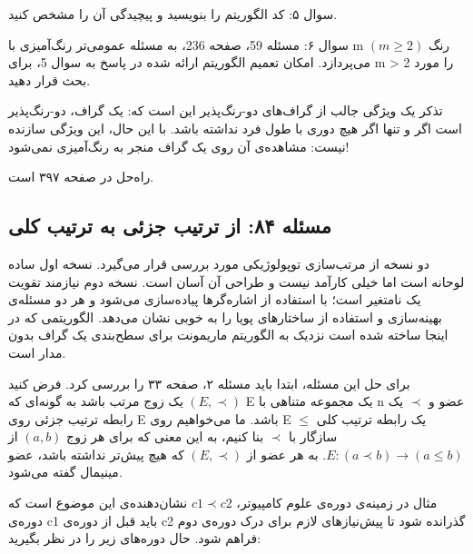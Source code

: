 \documentclass{book} %
\begin{document}
سوال ۵: کد الگوریتم را بنویسید و پیچیدگی آن را مشخص کنید.

سوال ۶: مسئله 59، صفحه 236، به مسئله عمومی‌تر رنگ‌آمیزی با m رنگ $(m \geq 2)$ می‌پردازد.
امکان تعمیم الگوریتم ارائه شده در پاسخ به سوال 5، برای m > 2 را مورد بحث قرار دهید.

تذکر
یک ویژگی جالب از گراف‌های دو-رنگ‌پذیر این است که: یک گراف، دو-رنگ‌پذیر است اگر و تنها اگر هیچ دوری با طول فرد نداشته باشد. با این حال، این ویژگی سازنده نیست: مشاهده‌ی آن روی یک گراف منجر به رنگ‌آمیزی نمی‌شود!

راه‌حل در صفحه ۳۹۷ است.

\newpage

\subsection {مسئله ۸۴: از ترتیب جزئی به ترتیب کلی}

دو نسخه از مرتب‌سازی توپولوژیکی مورد بررسی قرار می‌گیرد. نسخه اول ساده لوحانه است
اما خیلی کارآمد نیست و طراحی آن آسان است. نسخه دوم نیازمند تقویت یک نامتغیر است؛ با استفاده از اشاره‌گرها پیاده‌سازی می‌شود و هر دو مسئله‌ی بهینه‌سازی و
استفاده از ساختارهای پویا را به خوبی نشان می‌دهد. الگوریتمی که در اینجا ساخته شده است
نزدیک به الگوریتم ماریمونت برای سطح‌بندی یک گراف بدون مدار است.

برای حل این مسئله، ابتدا باید مسئله ۲، صفحه ۳۳ را بررسی کرد.
فرض کنید $(E, \prec)$ یک زوج مرتب باشد به گونه‌ای که E یک مجموعه متناهی با n عضو
و $\prec$ یک رابطه ترتیب جزئی روی E باشد. ما می‌خواهیم روی E یک رابطه ترتیب کلی
$\le$ سازگار با $\prec$ بنا کنیم، به این معنی که برای هر زوج $(a, b)$ از $E: (a \prec b) \rightarrow (a \le b)$.
به هر عضو از $(E, \prec)$ که هیچ پیش‌تر نداشته باشد، عضو مینیمال گفته می‌شود.


مثال
در زمینه‌ی دوره‌ی علوم کامپیوتر، $c1 \prec c2$ نشان‌دهنده‌ی این موضوع است که دوره‌ی c1 باید
قبل از دوره‌ی c2 گذرانده شود تا پیش‌نیازهای لازم برای درک دوره‌ی دوم فراهم شود.
حال دوره‌های زیر را در نظر بگیرید:


\end{document}
